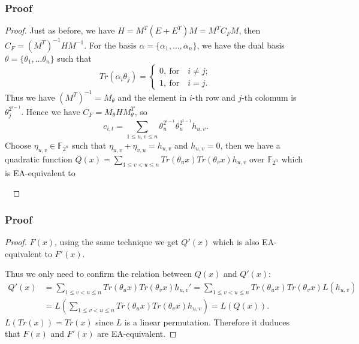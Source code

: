 \documentclass[
    aspectratio=169,                   %
]{beamer}
\newcommand{\F}{\mathbb{F}}
\begin{document}
    \begin{frame}
        \frametitle{Proof} 
        \begin{proof}
            Just as before, we have $ H=M^T(E+E^T)M=M^TC_FM $, then $ C_F=(M^T)^{-1}HM^{-1} $. 
            For the basis $ \alpha=\{\alpha_1,...,\alpha_n\} $, we have the dual basis $ \theta=\{\theta_1,...\theta_n\} $ such that 
            \[Tr(\alpha_i\theta_j)=\left\{
                \begin{aligned}
                    0,~ \text{for}\quad i\ne j;\\
                    1,~ \text{for}\quad i= j.
                \end{aligned}\right.\]
            Thus we have $ (M^T)^{-1}=M_{\theta} $ and the element in $ i $-th row and $ j $-th colomum is 
            $ \theta_j^{2^{i-1}} $. Hence we have $ C_F=M_{\theta}HM_{\theta}^T $, so 
            \[c_{i,t}=\sum_{1\le u,v\le n}\theta_u^{2^{i-1}}\theta_u^{2^{t-1}}h_{u,v}.\]
            Choose $ \eta_{u,v}\in\F_{2^n} $ such that $ \eta_{u,v}+\eta_{v,u}=h_{u,v} $ and $ h_{u,v}=0 $, 
            then we have a quadratic function $ Q(x)=\sum_{1\le v<u\le n}Tr(\theta_ux)Tr(\theta_vx)h_{u,v} $ 
            over $ \F_{2^n} $ which is EA-equivalent to 
            \par
            ~
            \par
           
        \end{proof}

    \end{frame}
    \begin{frame}
        \frametitle{Proof}
        \begin{proof}
            
            $ F(x) $,
            using the same technique we get $ Q'(x) $ which is also EA-equivalent to $ F'(x) $.
            
            Thus we only need to confirm the relation between $ Q(x) $ and $ Q'(x) $:
            \begin{align*}
                Q'(x)&=\sum_{1\le v<u\le n}Tr(\theta_ux)Tr(\theta_vx)h_{u,v}'=\sum_{1\le v<u\le n}Tr(\theta_ux)Tr(\theta_vx)L(h_{u,v})\\
                &=L(\sum_{1\le v<u\le n}Tr(\theta_ux)Tr(\theta_vx)h_{u,v})=L(Q(x)).
            \end{align*}
            $ L(Tr(x))=Tr(x) $ since $ L $ is a linear permutation. Therefore it duduces that $ F(x) $ and $ F'(x) $
            are  EA-equivalent.
        \end{proof}
            
    \end{frame}
    
\end{document}
